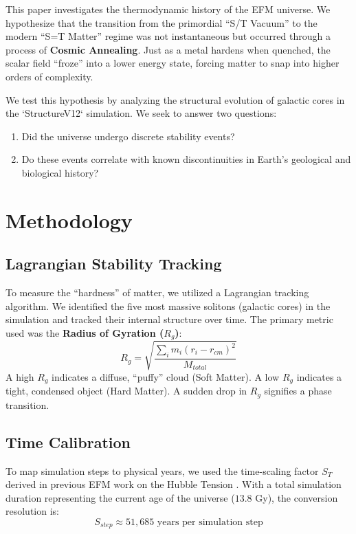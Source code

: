 \documentclass[11pt, twoside]{article}
\begin{document}
This paper investigates the thermodynamic history of the EFM universe. We hypothesize that the transition from the primordial ``S/T Vacuum'' to the modern ``S=T Matter'' regime was not instantaneous but occurred through a process of \textbf{Cosmic Annealing}. Just as a metal hardens when quenched, the scalar field ``froze'' into a lower energy state, forcing matter to snap into higher orders of complexity.

We test this hypothesis by analyzing the structural evolution of galactic cores in the `StructureV12` simulation. We seek to answer two questions:
\begin{enumerate}
    \item Did the universe undergo discrete stability events?
    \item Do these events correlate with known discontinuities in Earth's geological and biological history?
\end{enumerate}

\section{Methodology}

\subsection{Lagrangian Stability Tracking}
To measure the ``hardness'' of matter, we utilized a Lagrangian tracking algorithm. We identified the five most massive solitons (galactic cores) in the simulation and tracked their internal structure over time. The primary metric used was the \textbf{Radius of Gyration ($R_g$)}:
\begin{equation}
    R_g = \sqrt{\frac{\sum_i m_i (r_i - r_{cm})^2}{M_{total}}}
\end{equation}
A high $R_g$ indicates a diffuse, ``puffy'' cloud (Soft Matter). A low $R_g$ indicates a tight, condensed object (Hard Matter). A sudden drop in $R_g$ signifies a phase transition.

\subsection{Time Calibration}
To map simulation steps to physical years, we used the time-scaling factor $S_T$ derived in previous EFM work on the Hubble Tension \cite{emvula2025_hubble}. With a total simulation duration representing the current age of the universe ($13.8$ Gy), the conversion resolution is:
\begin{equation}
    S_{step} \approx 51,685 \text{ years per simulation step}
\end{equation}
\end{document}
